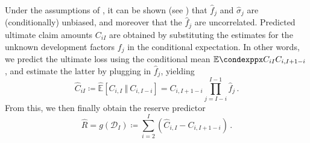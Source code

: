 \documentclass[a4paper]{book}
\begin{document}
Under the assumptions of , it can be shown (see \cite[17 \psqq]{wuthrich:stochastic-reserving}) that $\widehat{f}_j$ and $\widehat{\sigma}_j$ are (conditionally) unbiased, and moreover that the $\widehat{f}_j$ are uncorrelated. Predicted ultimate claim amounts $C_{iI}$ are obtained by substituting the estimates for the unknown development factors $f_j$ in the conditional expectation. In other words, we predict the ultimate loss using the conditional mean $\condexpp{C_{iI}}{C_{i, I + 1 - i}}$, and estimate the latter by plugging in $\widehat{f}_j$, yielding
\begin{equation}
    \widehat{C}_{iI} \coloneqq \widehat{\mathbb{E}}[C_{i, I} \ \Vert \ C_{i, I - i}] = C_{i, I + 1 - i} \prod_{j = I - i}^{I-1} \widehat{f}_j \,.
\end{equation}
From this, we then finally obtain the reserve predictor
\begin{equation} \label{eq:reserve-predictor}
    \widehat{R} = g(\mathcal{D}_I) \coloneqq \sum_{i = 2}^I (\widehat{C}_{i, I} - C_{i, I + 1- i}) \,. 
\end{equation}
\end{document}
